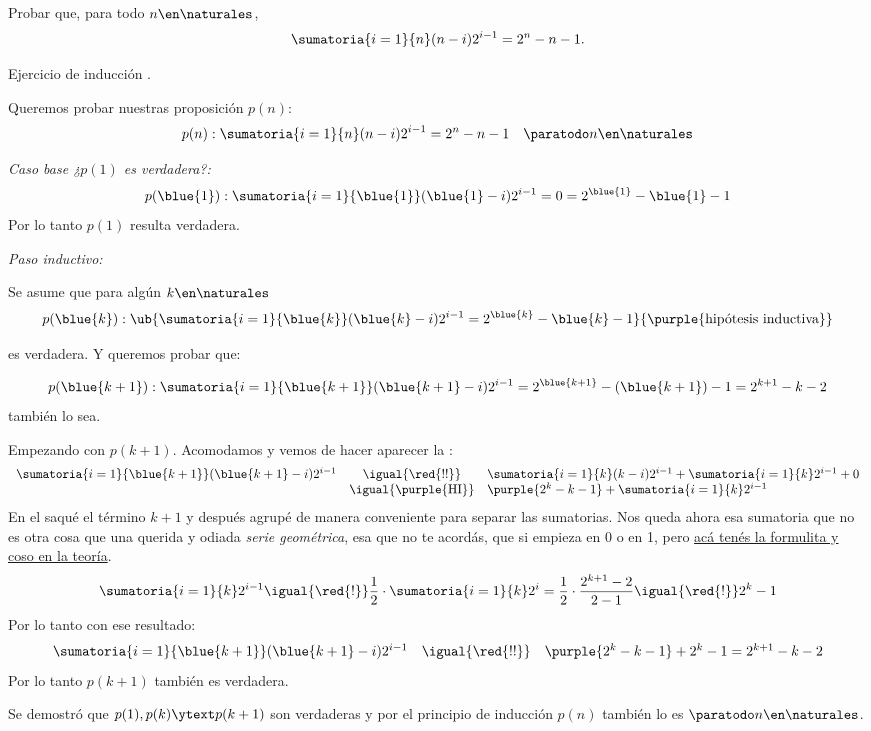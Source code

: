 \begin{enunciado}{\ejExtra}
  Probar que, para todo $n \en \naturales$,
  $$
    \sumatoria{i=1}{n}(n-i)2^{i-1} = 2^n -n -1.
  $$
\end{enunciado}
Ejercicio de inducción .

Queremos probar nuestras proposición $p(n)$:
$$
  p(n) : \sumatoria{i=1}{n}(n-i)2^{i-1} = 2^n - n -1 \quad \paratodo n \en \naturales
$$

\textit{Caso base  ¿$p(1)$ es verdadera?:}
$$
  p(\blue{1}) : \sumatoria{i=1}{\blue{1}}(\blue{1} - i)2^{i-1} = 0 =  2^{\blue{1}} - \blue{1} -1
$$
Por lo tanto $p(1)$ resulta verdadera.

\textit{Paso inductivo:}

Se asume que para algún $k\en \naturales$
$$
  p(\blue{k}) : \ub{
  \sumatoria{i=1}{\blue{k}}(\blue{k} - i)2^{i-1} =  2^{\blue{k}} - \blue{k} - 1
  }{\purple{\text{hipótesis inductiva}}}
$$

es verdadera. Y queremos probar que:

$$
  p(\blue{k+1}) : \sumatoria{i=1}{\blue{k+1}}(\blue{k+1}-i)2^{i-1} =  2^{\blue{k+1}} - (\blue{k+1}) - 1 = 2^{k+1} - k - 2
$$
también lo sea.

Empezando con $p(k+1)$. Acomodamos y vemos de hacer aparecer la :
$$
  \begin{array}{rcl}
    \sumatoria{i=1}{\blue{k+1}}(\blue{k+1}-i)2^{i-1} & \igual{\red{!!}}           & \sumatoria{i=1}{k}(k-i)2^{i-1} + \sumatoria{i=1}{k} 2^{i-1} + 0 \\
                                                     & \igual{\purple{\text{HI}}} & \purple{2^k - k - 1} +  \sumatoria{i=1}{k} 2^{i-1}
  \end{array}
$$
En el \red{!!} saqué el término $k+1$ y después agrupé de manera conveniente para separar las sumatorias. Nos queda ahora esa sumatoria que no es
otra cosa que una querida y odiada \textit{serie geométrica}, esa que no te acordás, que si empieza en 0 o en 1,
pero \hyperlink{2-teoria:geometrica}{acá tenés la formulita y coso en la teoría}.
$$
  \sumatoria{i=1}{k} 2^{i-1} \igual{\red{!}}
  \frac{1}{2} \cdot \sumatoria{i=1}{k} 2^i =
  \frac{1}{2} \cdot \frac{2^{k+1} - 2}{2 - 1}
  \igual{\red{!}}
  2^k - 1
$$
Por lo tanto con ese resultado:
$$
  \begin{array}{rcl}
    \sumatoria{i=1}{\blue{k+1}}(\blue{k+1}-i)2^{i-1} & \igual{\red{!!}} & \purple{2^k - k - 1} + 2^k - 1 =  2^{k+1} - k - 2
  \end{array}
$$
Por lo tanto $p(k+1)$ también es verdadera.

\bigskip

Se demostró que $p(1), p(k) \ytext p(k+1)$ son verdaderas y por el principio de inducción $p(n)$ también lo es $\paratodo n \en \naturales$.

\begin{aportes}
  \item {}
  \item {}
\end{aportes}
